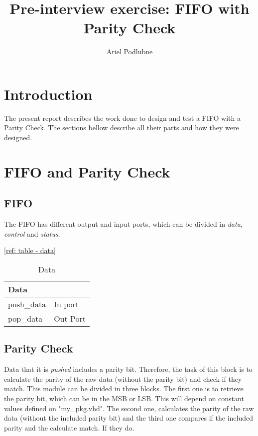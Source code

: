 \documentclass[12pt]{article}
\begin{document}
 
 
\newcommand{\mytext}[1]{{\normalfont{\textit{#1}}}}
\newcommand{\fifo}{FIFO\xspace}
\newcommand{\paritycheck}{Parity Check}

\title{Pre-interview exercise: FIFO with Parity Check}
\author{Ariel Podlubne}
\maketitle
 
\section{Introduction}
The present report describes the work done to design and test a \fifo with a \paritycheck. The sections bellow describe all their parts and how they were designed.
 
\section{\fifo and \paritycheck}
\subsection{\fifo}
The \fifo has different output and input ports, which can be divided in \textit{data}, \textit{control} and \textit{status}.

\begin{table}[]
\centering
\ref{ref: table - data}
\caption{Data}
\label{my-label}
\begin{tabular}{|l|l|}
\hline
\multicolumn{2}{|l|}{Data} \\ \hline
push\_data    & In port    \\ \hline
pop\_data     & Out Port   \\ \hline
\end{tabular}
\end{table}

\subsection{\paritycheck}

Data that it is \textit{pushed} includes a parity bit. Therefore, the task of this block is to calculate the parity of the raw data (without the parity bit) and check if they match. This module can be divided in three blocks. The first one is to retrieve the parity bit, which can be in the MSB or LSB. This will depend on constant values defined on "my\_pkg.vhd". The second one, calculates the parity of the raw data (without the included parity bit) and the third one compares if the included parity and the calculate match. If they do.
\end{document}
